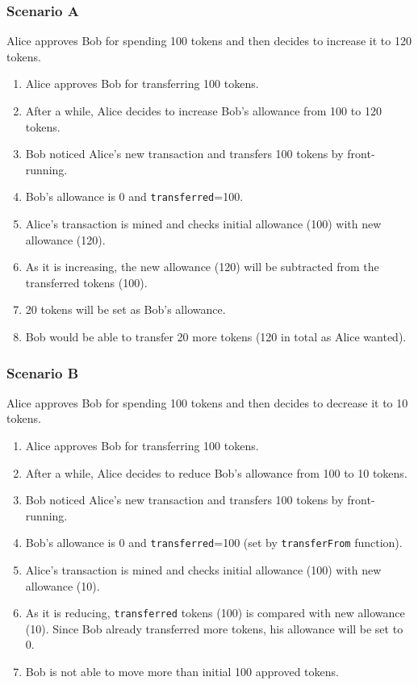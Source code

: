 \subsubsection*{Scenario A} Alice approves Bob for spending 100 tokens and then decides to increase it to 120 tokens.
\begin{enumerate}
	\item Alice approves Bob for transferring 100 tokens.
	\item After a while, Alice decides to increase Bob’s allowance from 100 to 120 tokens.
	\item Bob noticed Alice’s new transaction and transfers 100 tokens by front-running.
	\item Bob’s allowance is 0 and \texttt{transferred}=100.
	\item Alice’s transaction is mined and checks initial allowance (100) with new allowance (120).
	\item As it is increasing, the new allowance (120) will be subtracted from the transferred tokens (100).
	\item 20 tokens will be set as Bob’s allowance.
	\item Bob would be able to transfer 20 more tokens (120 in total as Alice wanted).\newline
\end{enumerate}
 
\subsubsection*{Scenario B} Alice approves Bob for spending 100 tokens and then decides to decrease it to 10 tokens.
\begin{enumerate}
	\item Alice approves Bob for transferring 100 tokens.
	\item After a while, Alice decides to reduce Bob’s allowance from 100 to 10 tokens.
	\item Bob noticed Alice’s new transaction and transfers 100 tokens by front-running.
	\item Bob’s allowance is 0 and \texttt{transferred}=100 (set by \texttt{transferFrom} function).
	\item Alice’s transaction is mined and checks initial allowance (100) with new allowance (10).
	\item As it is reducing, \texttt{transferred} tokens (100) is compared with new allowance (10). Since Bob already transferred more tokens, his allowance will be set to 0.
	\item Bob is not able to move more than initial 100 approved tokens.
\end{enumerate}

